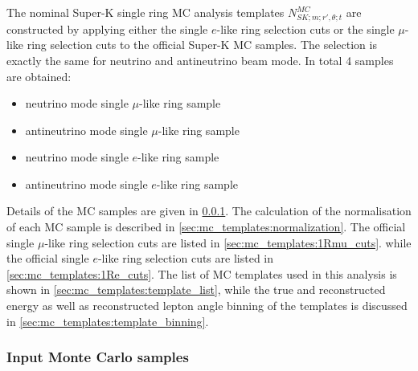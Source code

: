 The nominal Super-K single ring MC analysis templates $N_{SK;m;r\prime,\theta;t}^{MC}$
are constructed by applying either the single $e$-like ring selection cuts 
or the single $\mu$-like ring selection cuts 
to the official Super-K MC samples.
The selection is exactly the same for neutrino and antineutrino beam mode.
In total 4 samples are obtained:
\begin{itemize}
\item neutrino mode single $\mu$-like ring sample  
\item antineutrino mode single $\mu$-like ring sample  
\item neutrino mode single $e$-like ring sample  
\item antineutrino mode single $e$-like ring sample  
\end{itemize}
Details of the MC samples are given in \cref{sec:mc_templates:input_mc}.
The calculation of the normalisation of each MC sample is described in \cref{sec:mc_templates:normalization}.
The official single $\mu$-like ring selection cuts are listed in \cref{sec:mc_templates:1Rmu_cuts}.
while the official single $e$-like ring selection cuts are listed in \cref{sec:mc_templates:1Re_cuts}.
The list of MC templates used in this analysis is shown in \cref{sec:mc_templates:template_list},
while the true and reconstructed energy as well as reconstructed lepton angle binning of the templates is discussed 
in \cref{sec:mc_templates:template_binning}.

\subsubsection {Input Monte Carlo samples}
\label{sec:mc_templates:input_mc}



